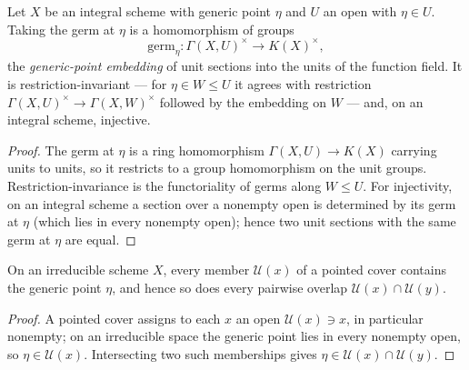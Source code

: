 \begin{definition}
  \label{pa-def:germGenericUnits}
  \leanok

  Let \(X\) be an integral scheme with generic point \(\eta\) and \(U\) an open with
  \(\eta \in U\). Taking the germ at \(\eta\) is a homomorphism of groups
  \[
    \mathrm{germ}_\eta \colon \Gamma(X,U)^{\times} \longrightarrow K(X)^{\times},
  \]
  the \emph{generic-point embedding} of unit sections into the units of the function field. It is
  restriction-invariant --- for \(\eta \in W \le U\) it agrees with restriction
  \(\Gamma(X,U)^{\times} \to \Gamma(X,W)^{\times}\) followed by the embedding on \(W\) --- and, on
  an integral scheme, injective.
\end{definition}
\begin{proof}
  \leanok
  The germ at \(\eta\) is a ring homomorphism \(\Gamma(X,U) \to K(X)\) carrying units to units, so
  it restricts to a group homomorphism on the unit groups. Restriction-invariance is the
  functoriality of germs along \(W \le U\). For injectivity, on an integral scheme a section over
  a nonempty open is determined by its germ at \(\eta\) (which lies in every nonempty open); hence
  two unit sections with the same germ at \(\eta\) are equal.
\end{proof}

\begin{lemma}
  \label{pa-lem:pointedCover_genericPoint_mem}
  \leanok

  On an irreducible scheme \(X\), every member \(\mathcal U(x)\) of a pointed cover contains the
  generic point \(\eta\), and hence so does every pairwise overlap \(\mathcal U(x) \cap \mathcal
  U(y)\).
\end{lemma}
\begin{proof}
  \leanok
  A pointed cover assigns to each \(x\) an open \(\mathcal U(x) \ni x\), in particular nonempty;
  on an irreducible space the generic point lies in every nonempty open, so \(\eta \in \mathcal
  U(x)\). Intersecting two such memberships gives \(\eta \in \mathcal U(x) \cap \mathcal U(y)\).
\end{proof}


